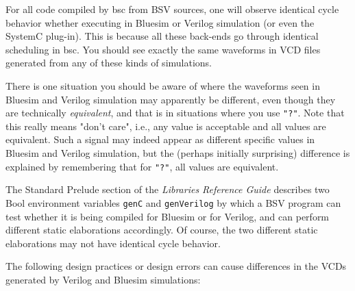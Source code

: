 \documentclass{article}
\newcommand{\te}[1]{\texttt{#1}}
\begin{document}
For all code compiled by bsc from BSV sources, one will observe
identical cycle behavior whether executing in Bluesim or Verilog
simulation (or even the SystemC plug-in).  This is because all these
back-ends go through identical scheduling in bsc.  You should see
exactly the same waveforms in VCD files generated from any of these
kinds of simulations.

There is one situation you should be aware of where the waveforms seen
in Bluesim and Verilog simulation may apparently be different, even
though they are technically {\em equivalent}, and that is in situations
where you use \te{"?"}.  Note that this really means "don't care",
i.e., any value is acceptable and all values are equivalent.  Such a
signal may indeed appear as different specific values in Bluesim and
Verilog simulation, but the (perhaps initially surprising) difference
is explained by remembering that for \te{"?"}, all values are equivalent.

The Standard Prelude section  of the {\em  Libraries Reference Guide} describes two Bool environment
variables \te{genC} and \te{genVerilog} by which a BSV program can test
whether it is being compiled for Bluesim or for Verilog, and can perform
different static elaborations accordingly.  Of course, the two
different static elaborations may not have identical cycle behavior.



The following design practices or design errors can cause differences in the VCDs
generated by  Verilog and Bluesim simulations:
\end{document}
